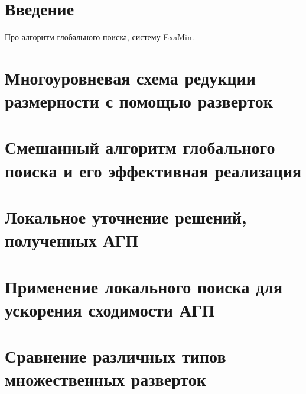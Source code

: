 \section{Введение}
Про алгоритм глобального поиска, систему ExaMin.
\cite{dftSignal}
\section{Многоуровневая схема редукции размерности с помощью разверток}

\section{Смешанный алгоритм глобального поиска и его эффективная реализация}

\section{Локальное уточнение решений, полученных АГП}

\section{Применение локального поиска для ускорения сходимости АГП}

\section{Сравнение различных типов множественных разверток}
